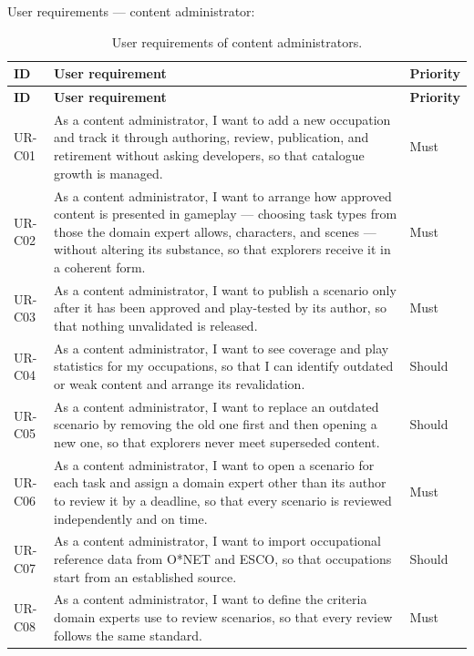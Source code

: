 User requirements --- content administrator:

{\small
\begin{longtable}{|>{\raggedright\arraybackslash}p{}|>{\raggedright\arraybackslash}p{}|>{\raggedright\arraybackslash}p{}|}
\caption{User requirements of content administrators.} \\
\hline
\textbf{ID} & \textbf{User requirement} & \textbf{Priority} \\ \hline
\endfirsthead
\hline
\textbf{ID} & \textbf{User requirement} & \textbf{Priority} \\ \hline
\endhead
UR-C01 & As a content administrator, I want to add a new occupation and track it through authoring, review, publication, and retirement without asking developers, so that catalogue growth is managed. & Must \\ \hline
UR-C02 & As a content administrator, I want to arrange how approved content is presented in gameplay --- choosing task types from those the domain expert allows, characters, and scenes --- without altering its substance, so that explorers receive it in a coherent form. & Must \\ \hline
UR-C03 & As a content administrator, I want to publish a scenario only after it has been approved and play-tested by its author, so that nothing unvalidated is released. & Must \\ \hline
UR-C04 & As a content administrator, I want to see coverage and play statistics for my occupations, so that I can identify outdated or weak content and arrange its revalidation. & Should \\ \hline
UR-C05 & As a content administrator, I want to replace an outdated scenario by removing the old one first and then opening a new one, so that explorers never meet superseded content. & Should \\ \hline
UR-C06 & As a content administrator, I want to open a scenario for each task and assign a domain expert other than its author to review it by a deadline, so that every scenario is reviewed independently and on time. & Must \\ \hline
UR-C07 & As a content administrator, I want to import occupational reference data from O*NET and ESCO, so that occupations start from an established source. & Should \\ \hline
UR-C08 & As a content administrator, I want to define the criteria domain experts use to review scenarios, so that every review follows the same standard. & Must \\ \hline
\end{longtable}
}

